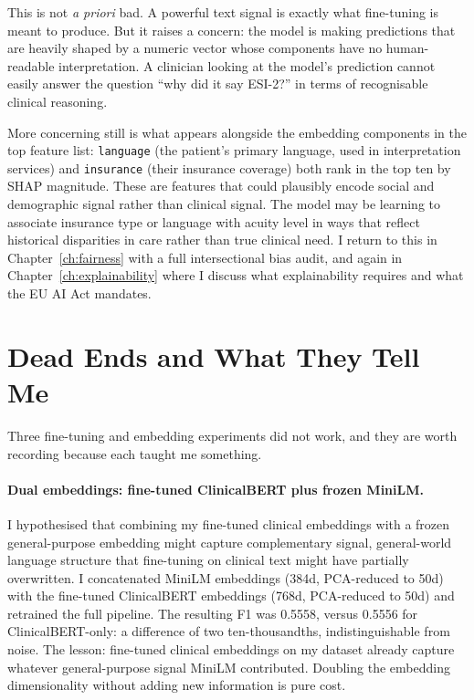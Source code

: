 This is not \emph{a priori} bad. A powerful text signal is exactly what fine-tuning is meant to produce. But it raises a concern: the model is making predictions that are heavily shaped by a numeric vector whose components have no human-readable interpretation. A clinician looking at the model's prediction cannot easily answer the question ``why did it say ESI-2?'' in terms of recognisable clinical reasoning.

More concerning still is what appears alongside the embedding components in the top feature list: \texttt{language} (the patient's primary language, used in interpretation services) and \texttt{insurance} (their insurance coverage) both rank in the top ten by SHAP magnitude. These are features that could plausibly encode social and demographic signal rather than clinical signal. The model may be learning to associate insurance type or language with acuity level in ways that reflect historical disparities in care rather than true clinical need. I return to this in Chapter~\ref{ch:fairness} with a full intersectional bias audit, and again in Chapter~\ref{ch:explainability} where I discuss what explainability requires and what the EU AI Act mandates.

\section{Dead Ends and What They Tell Me}

Three fine-tuning and embedding experiments did not work, and they are worth recording because each taught me something.

\paragraph{Dual embeddings: fine-tuned ClinicalBERT plus frozen MiniLM.} I hypothesised that combining my fine-tuned clinical embeddings with a frozen general-purpose embedding might capture complementary signal, general-world language structure that fine-tuning on clinical text might have partially overwritten. I concatenated MiniLM embeddings (384d, PCA-reduced to 50d) with the fine-tuned ClinicalBERT embeddings (768d, PCA-reduced to 50d) and retrained the full pipeline. The resulting F1 was 0.5558, versus 0.5556 for ClinicalBERT-only: a difference of two ten-thousandths, indistinguishable from noise. The lesson: fine-tuned clinical embeddings on my dataset already capture whatever general-purpose signal MiniLM contributed. Doubling the embedding dimensionality without adding new information is pure cost.

